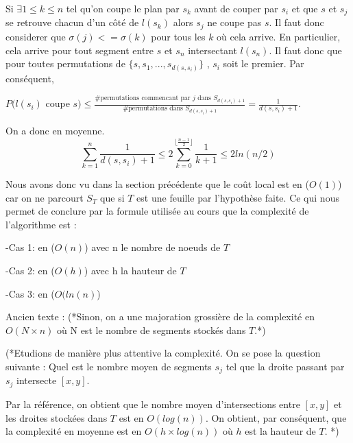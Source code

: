 Si $ \exists 1 \le  k \le n $ tel qu'on coupe le plan par $s_k$ avant de couper par $s_i$ et que $s$ et $s_j$ se retrouve chacun d'un côté de $l(s_k)$ alors $s_j$ ne coupe pas $s$.
Il faut donc considerer que $\sigma (j) <= \sigma (k)$ pour tous les $k$ où cela arrive.
En particulier, cela arrive pour tout segment entre $s$ et $s_n$ intersectant $l(s_n)$.
Il faut donc que pour toutes permutations de $\{ s, s_1,...,s_{d(s,s_i)} \}$ , $s_i$ soit le premier.
Par conséquent, 

$P(l(s_i)$ coupe $s) \le
\frac {\# \mbox {permutations commencant par } j \mbox{ dans } S_{d(s,s_i)+1}}
{\# \mbox {permutations dans } S_{d(s,s_i)+1}} = \frac 1 {d(s,s_i)+1}$.

On a donc en moyenne. $$\sum_{k=1}^{n} \frac 1 {d(s,s_i)+1}        \le 2 \sum_{k=0}^{\lfloor \frac {n-1} 2 \rfloor}  \frac 1{k+1} \le 2 ln (n/2) $$


Nous avons donc vu dans la section précédente que le coût local est en ($O(1)$) car on ne parcourt $S_T$ que si $T$ est une feuille par l'hypothèse faite.
Ce qui nous permet de conclure par la formule utilisée au cours que la complexité
de l'algorithme est :

-Cas 1: en ($O(n)$) avec n le nombre de noeuds de $T$ 

-Cas 2: en ($O(h)$) avec h la hauteur de $T$

-Cas 3: en ($O(ln(n)$)



Ancien texte : 
(*Sinon, on a une majoration grossière de la complexité en $O(N \times n)$
où N est le nombre de segments stockés dans $T$.*)

(*Etudions de manière plus attentive la complexité. On se pose la question suivante :
Quel est le nombre moyen de segments $s_j$ tel que la droite passant par $s_j$ intersecte $[x,y]$.

Par la référence, on obtient que le nombre moyen d'intersections entre $[x,y]$ et les droites
stockées dans $T$ est en $O(log (n))$. On obtient, par conséquent, que la complexité en moyenne
est en $O(h \times log (n))$ où $h$ est la hauteur de $T$. *) 